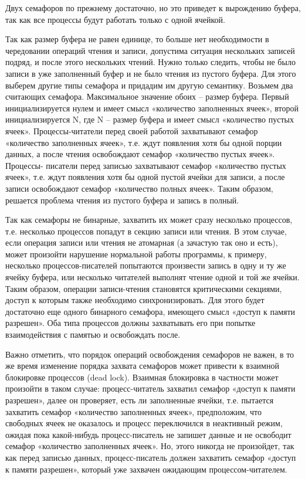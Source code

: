\documentclass[a4paper]{article}
\begin{document}
	Двух семафоров по прежнему достаточно, но это приведет к вырождению буфера, так как все процессы будут работать только с одной ячейкой.
	
	Так как размер буфера не равен единице, то больше нет необходимости в чередовании операций чтения и записи, допустима ситуация нескольких записей подряд, и после этого нескольких чтений. Нужно только следить, чтобы не было записи в уже заполненный буфер и не было чтения из пустого буфера. Для этого выберем другие типы семафора и придадим им другую семантику. Возьмем два считающих семафора. Максимальное значение обоих – размер буфера. Первый инициализируется нулем и имеет смысл «количество заполненных ячеек», второй инициализируется N, где N – размер буфера и имеет смысл «количество пустых ячеек». Процессы-читатели перед своей работой захватывают семафор «количество заполненных ячеек», т.е. ждут появления хотя бы одной порции данных, а после чтения освобождают семафор «количество пустых ячеек». Процессы- писатели перед записью захватывают семафор «количество пустых ячеек», т.е. ждут появления хотя бы одной пустой ячейки для записи, а после записи освобождают семафор «количество полных ячеек». Таким образом, решается проблема чтения из пустого буфера и запись в полный.
	
	Так как семафоры не бинарные, захватить их может сразу несколько процессов, т.е. несколько процессов попадут в секцию записи или чтения. В этом случае, если операция записи или чтения не атомарная (а зачастую так оно и есть), может произойти нарушение нормальной работы программы, к примеру, несколько процессов-писателей попытаются произвести запись в одну и ту же ячейку буфера, или несколько читателей выполнят чтение одной и той же ячейки. Таким образом, операции записи-чтения становятся критическими секциями, доступ к которым также необходимо синхронизировать. Для этого будет достаточно еще одного бинарного семафора, имеющего смысл «доступ к памяти разрешен». Оба типа процессов должны захватывать его при попытке взаимодействия с памятью и освобождать после.
	
	Важно отметить, что порядок операций освобождения семафоров не важен, в то же время изменение порядка захвата семафоров может привести к взаимной блокировке процессов (dead lock). Взаимная блокировка в частности может произойти в таком случае: процесс-читатель захватил семафор «доступ к памяти разрешен», далее он проверяет, есть ли заполненные ячейки, т.е. пытается захватить семафор «количество заполненных ячеек», предположим, что свободных ячеек не оказалось и процесс переключился в неактивный режим, ожидая пока какой-нибудь процесс-писатель не запишет данные и не освободит семафор «количество заполненных ячеек». Но, этого никогда не произойдет, так как перед записью данных, процесс-писатель должен захватить семафор «доступ к памяти разрешен», который уже захвачен ожидающим процессом-читателем.
	
\end{document}
